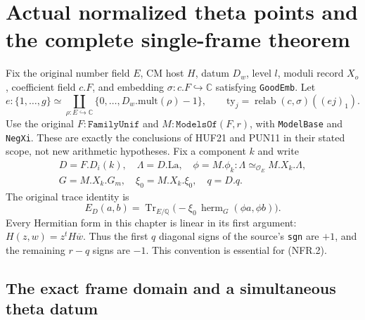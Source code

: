 \section{Actual normalized theta points and the complete single-frame theorem}
\label{sec:normalized-frames-v050}


Fix the original number field $E$, CM host $H$, datum $D_w$, level $l$,
moduli record $X_o$, coefficient field $c.F$, and embedding
$\sigma:c.F\hookrightarrow\mathbb C$ satisfying \texttt{GoodEmb}.
Let
\[
 e:\{1,\ldots,g\}\simeq
       \coprod_{\rho:E\hookrightarrow\mathbb C}\{0,\ldots,D_w.\mathrm{mult}(\rho)-1\},
 \qquad \mathrm{ty}_j=\operatorname{relab}(c,\sigma)((ej)_1).
 \tag{NFR.1}
\]
Use the original $F:\texttt{FamilyUnif}$ and
$M:\texttt{ModelsOf}(F,r)$, with \texttt{ModelBase} and \texttt{NegXi}.
These are exactly the conclusions of HUF21 and PUN11 in their stated
scope, not new arithmetic hypotheses.  Fix a component $k$ and write
\[
\begin{gathered}
D=F.D_i(k),\quad \Lambda=D.\mathrm{La},\quad
\phi=M.\phi_k:\Lambda\simeq_{\mathcal O_E}M.X_k.\Lambda,\\
G=M.X_k.G_m,\quad \xi_0=M.X_k.\xi_0,\quad q=D.q.
\end{gathered}
\]
The original trace identity is
\[
 E_D(a,b)=\operatorname{Tr}_{E/\mathbb Q}
                  \bigl(-\xi_0\,\operatorname{herm}_G(\phi a,\phi b)\bigr).
 \tag{NFR.2}
\]
Every Hermitian form in this chapter is linear in its first argument:
$H(z,w)=z^tH\overline w$.  Thus the first $q$ diagonal signs of
the source's \texttt{sgn} are $+1$, and the remaining $r-q$ signs
are $-1$.  This convention is essential for (NFR.2).

\subsection{The exact frame domain and a simultaneous theta datum}

